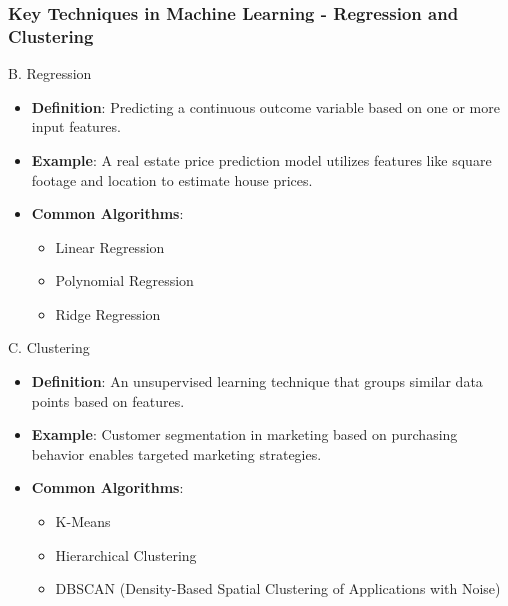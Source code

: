 \documentclass[aspectratio=169]{beamer}
\begin{document}
\begin{frame}[fragile]
    \frametitle{Key Techniques in Machine Learning - Regression and Clustering}
    \begin{block}{B. Regression}
        \begin{itemize}
            \item \textbf{Definition}: Predicting a continuous outcome variable based on one or more input features. 
            \item \textbf{Example}: A real estate price prediction model utilizes features like square footage and location to estimate house prices.
            \item \textbf{Common Algorithms}: 
                \begin{itemize}
                    \item Linear Regression
                    \item Polynomial Regression
                    \item Ridge Regression
                \end{itemize}
        \end{itemize}
    \end{block}

    \begin{block}{C. Clustering}
        \begin{itemize}
            \item \textbf{Definition}: An unsupervised learning technique that groups similar data points based on features.
            \item \textbf{Example}: Customer segmentation in marketing based on purchasing behavior enables targeted marketing strategies.
            \item \textbf{Common Algorithms}: 
                \begin{itemize}
                    \item K-Means
                    \item Hierarchical Clustering
                    \item DBSCAN (Density-Based Spatial Clustering of Applications with Noise)
                \end{itemize}
        \end{itemize}
    \end{block}
\end{frame}
\end{document}
